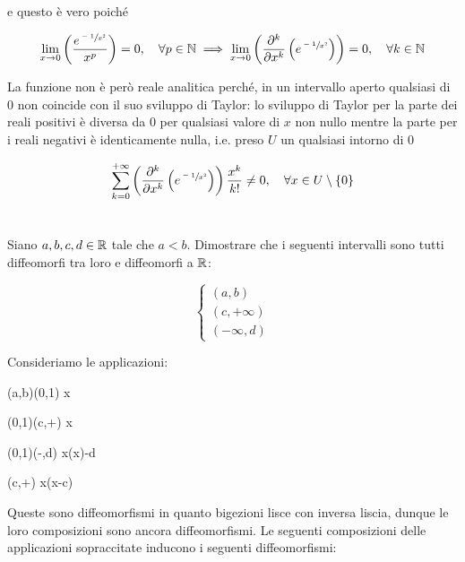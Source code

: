e questo è vero poiché

\begin{equation}
	\lim_{x \to 0} \left( \dfrac{e^{\sfrac{-1}{x^{2}}}}{x^{p}} \right) = 0 \qcomma \forall p \in \N %
	\implies%
	\lim_{x \to 0} \left( \pdv[k]{x} \left( e^{\sfrac{-1}{x^{2}}} \right) \right) = 0 \qcomma \forall k \in \N
\end{equation}

La funzione non è però reale analitica perché, in un intervallo aperto qualsiasi di 0 non coincide con il suo sviluppo di Taylor: lo sviluppo di Taylor per la parte dei reali positivi è diversa da 0 per qualsiasi valore di $ x $ non nullo mentre la parte per i reali negativi è identicamente nulla, i.e. preso $ U $ un qualsiasi intorno di 0

\begin{equation}
	\sum_{k=0}^{+\infty} \left( \pdv[k]{x} \left( e^{\sfrac{-1}{x^{2}}} \right) \right) \dfrac{x^{k}}{k!} \neq 0 \qcomma \forall x \in U \setminus \{0\}
\end{equation}

%

\newpage

%

\section{}\label{es1-3}

\begin{tcolorbox}
	Siano $ a,b,c,d \in \mathbb{R} $ tale che $ a<b $. Dimostrare che i seguenti intervalli sono tutti diffeomorfi tra loro e diffeomorfi a $ \mathbb{R} $:
	
	\begin{equation}
		\begin{cases}
			(a,b)\\
			(c,+\infty)\\
			(-\infty,d)
		\end{cases}
	\end{equation}
\end{tcolorbox}

Consideriamo le applicazioni:

	{(a,b)}{(0,1)}
	{x}{}

	{(0,1)}{(c,+\infty)}
	{x}{}
	
	{(0,1)}{(-\infty,d)}
	{x}{\ln(x)-d}
	
	{(c,+\infty)}{\R}
	{x}{\ln(x-c)}

Queste sono diffeomorfismi in quanto bigezioni lisce con inversa liscia, dunque le loro composizioni sono ancora diffeomorfismi. Le seguenti composizioni delle applicazioni sopraccitate inducono i seguenti diffeomorfismi:

